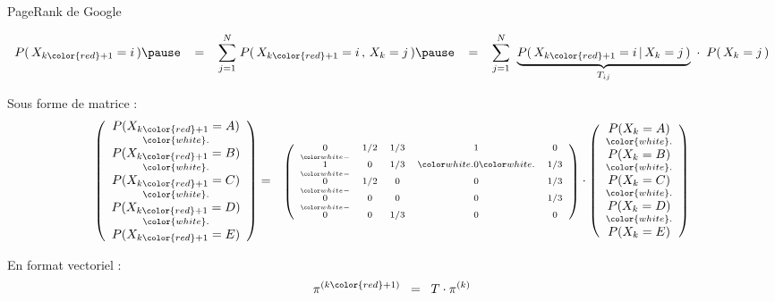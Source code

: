 
\begin{frame}{\Large PageRank de Google}

\scriptsize

\vskip -0.5cm

\begin{equation*}
P(\,X_{k{\color{red}+1}} = i\,)
\pause
\;\;\; = \;\;\;
	\overset{N}{\underset{j=1}{\sum}}\;
	P(\,X_{k{\color{red}+1}} = i \,,\, X_{k} = j\,)
\pause
\;\;\; = \;\;\;
	\overset{N}{\underset{j=1}{\sum}}\;\;
	\underset{T_{ij}}{\underbrace{P(\,X_{k{\color{red}+1}} = i \,\vert\, X_{k} = j\,)}} \;\cdot\; P(\,X_{k} = j\,)
\end{equation*}

\pause
Sous forme de matrice :
\begin{eqnarray*}
	\left(\begin{array}{c}
		\underset{{\color{white}.}}{P(X_{k{\color{red}+1}} = A)} \\
		\underset{{\color{white}.}}{P(X_{k{\color{red}+1}} = B)} \\
		\underset{{\color{white}.}}{P(X_{k{\color{red}+1}} = C)} \\
		\underset{{\color{white}.}}{P(X_{k{\color{red}+1}} = D)} \\
		P(X_{k{\color{red}+1}} = E) \\
	\end{array}\right)
& = &
	\textnormal{\scriptsize$\TMatrix$}
	\cdot
	\left(\begin{array}{c}
		\underset{{\color{white}.}}{P(X_{k} = A)} \\
		\underset{{\color{white}.}}{P(X_{k} = B)} \\
		\underset{{\color{white}.}}{P(X_{k} = C)} \\
		\underset{{\color{white}.}}{P(X_{k} = D)} \\
		P(X_{k} = E) \\
	\end{array}\right)
\end{eqnarray*}

\vskip 0.3cm

\pause
En format vectoriel :
\large
\begin{equation*}
\pi^{(k{\color{red}+1})} \;\; = \;\; T \cdot \pi^{(k)}
\end{equation*}

\end{frame}
\normalsize


